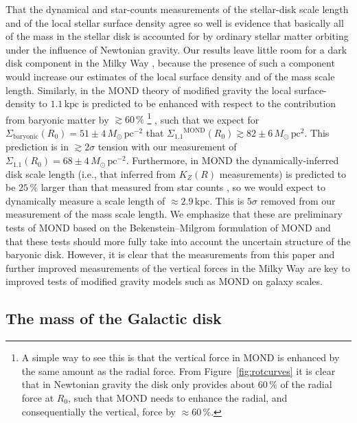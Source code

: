 \documentclass{emulateapj}
\newcommand{\ie}{i.e.}
\renewcommand{\figurename}{Figure}
\newcommand{\kpc}{\ensuremath{\,\mathrm{kpc}}}
\newcommand{\pc}{\ensuremath{\,\mathrm{pc}}}
\newcommand{\sigoneone}{\ensuremath{\Sigma_{1.1}}}
\begin{document}
That the dynamical and star-counts measurements of the stellar-disk
scale length and of the local stellar surface density agree so well is
evidence that basically all of the mass in the stellar disk is
accounted for by ordinary stellar matter orbiting under the influence
of Newtonian gravity. Our results leave little room for a dark disk
component in the Milky Way \citep{Read08a}, because the presence of
such a component would increase our estimates of the local surface
density and of the mass scale length. Similarly, in the MOND theory of
modified gravity the local surface-density to $1.1\kpc$ is predicted
to be enhanced with respect to the contribution from baryonic matter
by $\gtrsim60\,\%$ \footnote{A simple way to see this is that the
  vertical force in MOND is enhanced by the same amount as the radial
  force. From \figurename~\ref{fig:rotcurves} it is clear that in
  Newtonian gravity the disk only provides about $60\,\%$ of the
  radial force at $R_0$, such that MOND needs to enhance the radial,
  and consequentially the vertical, force by $\approx60\,\%$.}
\citep{Nipoti07a,Bienayme09a,Famaey12a}, such that we expect for
$\Sigma_{\mathrm{baryonic}}(R_0) = 51\pm4\,M_\odot\pc^{-2}$ that
$\sigoneone^{\mathrm{MOND}}(R_0) \gtrsim 82\pm6\,M_\odot\pc^2$. This
prediction is in $\gtrsim2\sigma$ tension with our measurement of
$\sigoneone(R_0) = 68\pm4\,M_\odot\pc^{-2}$. Furthermore, in MOND the
dynamically-inferred disk scale length (\ie, that inferred from
$K_Z(R)$ measurements) is predicted to be $25\,\%$ larger than that
measured from star counts \citep{Bienayme09a}, so we would expect to
dynamically measure a scale length of $\approx2.9\kpc$. This is
$5\sigma$ removed from our measurement of the mass scale length. We
emphasize that these are preliminary tests of MOND based on the
Bekenstein--Milgrom \citep{Bekenstein84a} formulation of MOND and that
these tests should more fully take into account the uncertain
structure of the baryonic disk. However, it is clear that the
measurements from this paper and further improved measurements of the
vertical forces in the Milky Way are key to improved tests of modified
gravity models such as MOND on galaxy scales.


\subsection{The mass of the Galactic disk}
\end{document}
